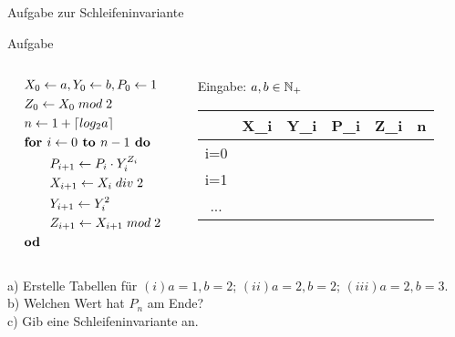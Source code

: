 \begin{frame}{Aufgabe zur Schleifeninvariante}

	\begin{exampleblock}{Aufgabe}
		\begin{columns}
			\begin{column}{0.35\textwidth}
				\small
				\begin{align*}
				&X_0 \leftarrow a, Y_0 \leftarrow b, P_0 \leftarrow 1\\
				&Z_0 \leftarrow X_0 \; mod \; 2\\
				&n \leftarrow 1 + \lceil log_2a \rceil\\
				&\text{\textbf{for }} i \leftarrow 0 \text{\textbf{ to }} n-1 \text{\textbf{ do}}\\
				&\qquad P_{i+1} \leftarrow P_{i} \cdot Y_{i}^{Z_i}\\
				&\qquad X_{i+1} \leftarrow X_{i} \; div \; 2\\
				&\qquad Y_{i+1} \leftarrow Y_{i}^{2}\\
				&\qquad Z_{i+1} \leftarrow X_{i+1} \; mod \; 2\\
				&\text{\textbf{od}}
				\end{align*}
			\end{column}

			\begin{column}{0.6\textwidth}
			\begin{center}
			Eingabe: $a,b \in \mathbb{N}_+$\\[18pt]
			\begin{tabular}{C C C C C C}
			 	&X_i&Y_i&P_i&Z_i&n\\
				\hline
				i=0& & & & &\\
				i=1& & & & &\\
				...& & & & & \\
			\end{tabular}\end{center}
			\end{column}
			
		\end{columns}
		a) Erstelle Tabellen für $(i)a=1,b=2$; $(ii) a=2,b=2$; $(iii) a=2,b=3$.\\
		b) Welchen Wert hat $P_n$ am Ende?\\
		c) Gib eine Schleifeninvariante an.

	\end{exampleblock}
\end{frame}

